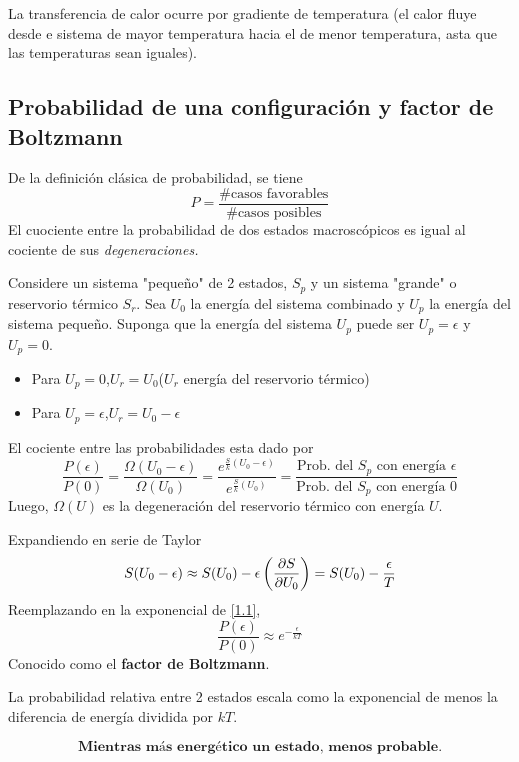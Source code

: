 \begin{cor}
	La transferencia de calor ocurre por gradiente de temperatura (el calor fluye desde e sistema de mayor temperatura hacia el de menor temperatura, asta que las temperaturas sean iguales).
\end{cor}

\subsection{Probabilidad de una configuración y factor de Boltzmann}
De la definición clásica de probabilidad, se tiene
\begin{equation}
  P=\frac{\# \text{casos favorables}}{\# \text{casos posibles}}
\end{equation}
El cuociente entre la probabilidad de dos estados macroscópicos es igual al cociente de sus \textit{degeneraciones.}

Considere un sistema "pequeño" de 2 estados, $S_p$ y un sistema "grande" o reservorio térmico $S_r$. Sea $U_0$ la energía del sistema combinado y $U_p$ la energía del sistema pequeño. Suponga que la energía del sistema $U_p$ puede ser $U_p=\epsilon$ y $U_p=0$.
\begin{itemize}
	\item Para $U_p=0$,\quad $U_r=U_0$\quad ($U_r$ energía del reservorio térmico)
	\item Para $U_p=\epsilon$,\quad $U_r=U_0-\epsilon$
\end{itemize}
El cociente entre las probabilidades esta dado por
\begin{equation}\label{1.1}
  \frac{P(\epsilon)}{P(0)}=\frac{\Omega(U_0-\epsilon)}{\Omega(U_0)}=\frac{e^{\frac{S}{k}(U_0-\epsilon)}}{e^{\frac{S}{k}(U_0)}}=\frac{\text{Prob. del $S_p$ con energía $\epsilon$}}{\text{Prob. del $S_p$ con energía $0$}}
\end{equation}
Luego, $\Omega(U)$ es la degeneración del reservorio térmico con energía $U$.

Expandiendo en serie de Taylor 
\begin{equation}
  S(U_0-\epsilon)\approx S(U_0)-\epsilon\left(\pdv{S}{U_0}\right)=S(U_0)-\frac{\epsilon}{T}
\end{equation}
Reemplazando en la exponencial de \eqref{1.1},
\begin{equation}
  \boxed{\frac{P(\epsilon)}{P(0)}\approx e^{-\frac{\epsilon}{kT}}}
\end{equation}
Conocido como el \textbf{factor de Boltzmann}.

La probabilidad relativa entre 2 estados escala como la exponencial de menos la diferencia de energía dividida por $kT$.

\begin{equation}
  \textbf{Mientras más energético un estado, menos probable.}
\end{equation}
































